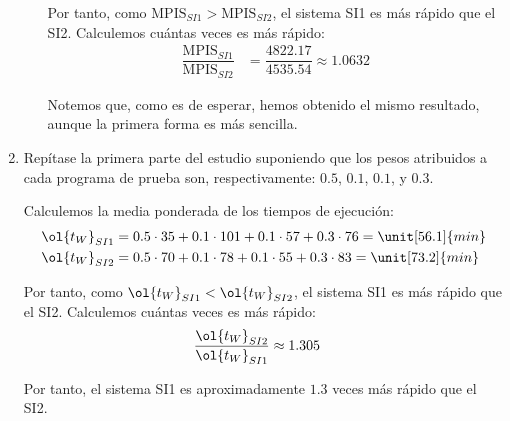 \begin{ejercicio}
\begin{enumerate}
\begin{enumerate}
        Por tanto, como $\text{MPIS}_{SI1} > \text{MPIS}_{SI2}$, el sistema SI1 es más rápido que el SI2. Calculemos cuántas veces es más rápido:
        \begin{align*}
            \dfrac{\text{MPIS}_{SI1}}{\text{MPIS}_{SI2}} &= \dfrac{4822.17}{4535.54} \approx 1.0632
        \end{align*}

        Notemos que, como es de esperar, hemos obtenido el mismo resultado, aunque la primera forma es más sencilla.

    \end{enumerate}
    \item Repítase la primera parte del estudio suponiendo que los pesos atribuidos a cada programa de prueba son, respectivamente: $0.5$, $0.1$, $0.1$, y $0.3$.
    
    Calculemos la media ponderada de los tiempos de ejecución: 
    \begin{align*}
        \ol{t_W}_{SI1} &= 0.5\cdot 35 + 0.1\cdot 101 + 0.1\cdot 57 + 0.3\cdot 76= \unit[56.1]{min}\\
        \ol{t_W}_{SI2} &= 0.5\cdot 70 + 0.1\cdot 78 + 0.1\cdot 55 + 0.3\cdot 83 = \unit[73.2]{min}
    \end{align*}

    Por tanto, como $\ol{t_W}_{SI1} < \ol{t_W}_{SI2}$, el sistema SI1 es más rápido que el SI2. Calculemos cuántas veces es más rápido:
    \begin{align*}
        \dfrac{\ol{t_W}_{SI2}}{\ol{t_W}_{SI1}} &\approx 1.305
    \end{align*}

    Por tanto, el sistema SI1 es aproximadamente $1.3$ veces más rápido que el SI2.
\end{enumerate}
\end{ejercicio}
\begin{comment}Sol:
1. El sistema SI1 es 1,06 veces más rápido que SI2 atendiendo al tiempo de ejecución. Los MIPS obtenidos por ambos sistemas son, respectivamente, 4822,2 y 4535,5.
2. En este nuevo escenario, el sistema SI1 es 1,3 veces más rápido que SI2 atendiendo al tiempo de ejecución.
\end{comment}

